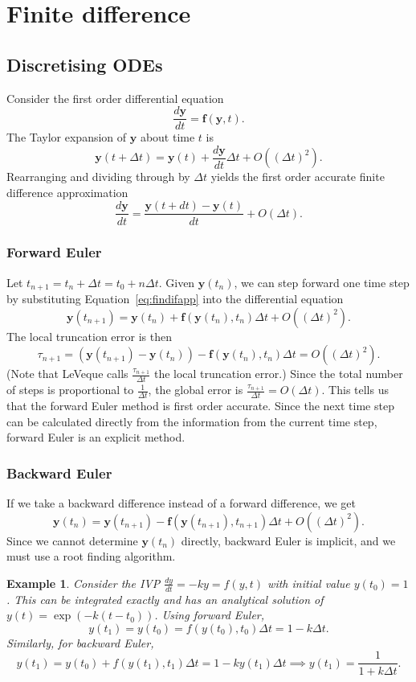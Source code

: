 \documentclass[11pt, a4paper]{article}
\theoremstyle{break}
\newtheorem{eg}[thm]{Example}
\newcommand{\ve}{\mathbf} %
\newcommand{\dt}{\Delta t}
\newcommand{\dder}[2]{\frac{d #1}{d #2}}
\begin{document}
\section{Finite difference}
\subsection{Discretising ODEs}
Consider the first order differential equation \[\dder {\ve y}t=\ve f({\ve y},t).\]
The Taylor expansion of ${\ve y}$ about time $t$ is \[\ve y(t+\dt)=\ve y(t)+ \dder {\ve y}t\dt+O((\dt)^2).\] Rearranging and dividing through by $\dt$ yields the first order accurate finite difference approximation \begin{equation}\label{eq:findifapp}\dder{\ve y}t=\frac{{\ve y}(t+dt)-{\ve y}(t)}{dt} + O(\dt).\end{equation}
\subsubsection{Forward Euler}
Let $t_{n+1}=t_n+\dt=t_0+n\dt$. Given $\ve y(t_n)$, we can step forward one time step by substituting Equation~\ref{eq:findifapp} into the differential equation \[\ve y(t_{n+1})=\ve y(t_n)+\ve f(\ve y(t_n),t_n)\dt +O((\dt)^2).\]
The local truncation error is then \[\tau_{n+1}=({\ve y(t_{n+1})-\ve y(t_n)})-\ve f(\ve y(t_n),t_n)\dt=O((\dt)^2).\] (Note that LeVeque calls $\frac{\tau_{n+1}}{\dt}$ the local truncation error.) Since the total number of steps is proportional to $\frac1{\dt}$, the global error is $\frac{\tau_{n+1}}{\dt}=O(\dt)$. This tells us that the forward Euler method is first order accurate. Since the next time step can be calculated directly from the information from the current time step, forward Euler is an explicit method.

\subsubsection{Backward Euler}
If we take a backward difference instead of a forward difference, we get \[\ve y(t_n)=\ve y(t_{n+1})-\ve f(\ve y(t_{n+1}),t_{n+1})\dt +O((\dt)^2).\] Since we cannot determine $\ve y(t_n)$ directly, backward Euler is implicit, and we must use a root finding algorithm.

\begin{eg}
Consider the IVP $\dder yt=-ky=f(y,t)$ with initial value $y(t_0)=1$. This can be integrated exactly and has an analytical solution of $y(t)=\exp(-k(t-t_0))$. Using forward Euler, \[y(t_1)=y(t_0)=f(y(t_0),t_0)\dt=1-k\dt.\] Similarly, for backward Euler, \[y(t_1)=y(t_0)+f(y(t_1),t_1)\dt = 1-ky(t_1)\dt \implies y(t_1)=\frac1{1+k\dt}.\]
\end{eg}
\end{document}
